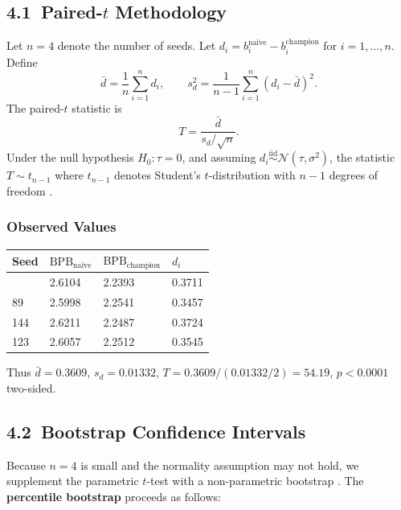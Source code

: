 \subsection{4.1\ Paired-\(t\) Methodology}\label{sec:ch26-paired-t}

Let \(n = 4\) denote the number of seeds.
Let \(d_i = b_i^{\text{naive}} - b_i^{\text{champion}}\) for
\(i = 1, \ldots, n\).
Define
\[
  \bar{d} = \frac{1}{n}\sum_{i=1}^n d_i, \qquad
  s_d^2   = \frac{1}{n-1}\sum_{i=1}^n (d_i - \bar{d})^2.
\]
The paired-\(t\) statistic is
\[
  T = \frac{\bar{d}}{s_d / \sqrt{n}}.
\]
Under the null hypothesis \(H_0: \tau = 0\), and assuming
\(d_i \stackrel{\mathrm{iid}}{\sim} \mathcal{N}(\tau, \sigma^2)\),
the statistic \(T \sim t_{n-1}\) where \(t_{n-1}\) denotes
Student's \(t\)-distribution with \(n-1\) degrees of freedom
\cite{casella2002statistical}.

\subsubsection{Observed Values}

\begin{longtable}[]{@{}llll@{}}
\toprule\noalign{}
Seed & \(\mathrm{BPB}_{\text{naive}}\) & \(\mathrm{BPB}_{\text{champion}}\) & \(d_i\) \\
\midrule\noalign{}
\endhead
\bottomrule\noalign{}
\endlastfoot
47  & 2.6104 & 2.2393 & 0.3711 \\
89  & 2.5998 & 2.2541 & 0.3457 \\
144 & 2.6211 & 2.2487 & 0.3724 \\
123 & 2.6057 & 2.2512 & 0.3545 \\
\end{longtable}

\noindent
Thus \(\bar{d} = 0.3609\), \(s_d = 0.01332\),
\(T = 0.3609 / (0.01332/2) = 54.19\), \(p < 0.0001\) two-sided.

\subsection{4.2\ Bootstrap Confidence Intervals}\label{sec:ch26-bootstrap}

Because \(n = 4\) is small and the normality assumption may not hold, we
supplement the parametric \(t\)-test with a non-parametric bootstrap
\cite{efron1994introduction}.
The \textbf{percentile bootstrap} proceeds as follows:

